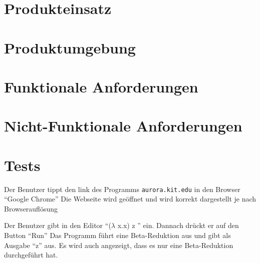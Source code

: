 \documentclass[parskip=full,11pt,twoside]{scrartcl}
\begin{document}


\pagebreak
\section{Produkteinsatz}


\section{Produktumgebung}


\section{Funktionale Anforderungen}





\section{Nicht-Funktionale Anforderungen}





\section{Tests}


{Der Benutzer tippt den link des Programms \texttt{aurora.kit.edu} in den Browser \enquote {Google Chrome} }
{ Die Webseite wird geöffnet und wird korrekt dargestellt je nach Browserauflösung}

{ Der Benutzer gibt in den Editor \enquote {($\lambda$ x.x) z } ein. Dannach drückt er auf den Button \enquote {Run}}
{ Das Programm führt eine Beta-Reduktion aus und gibt als Ausgabe \enquote {z} aus. Es wird auch angezeigt, dass es nur eine Beta-Reduktion durchgeführt hat.}
\end{document}
